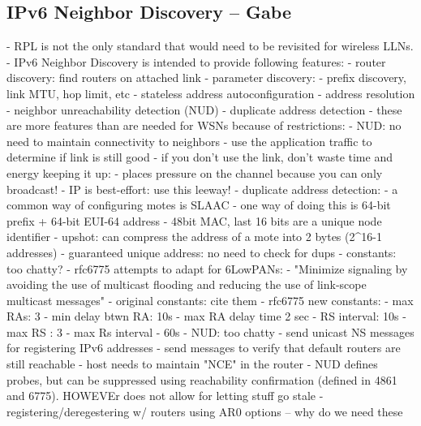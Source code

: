 \subsection{IPv6 Neighbor Discovery -- Gabe }
- RPL is not the only standard that would need to be revisited for wireless LLNs.
- IPv6 Neighbor Discovery is intended to provide following features:
    - router discovery: find routers on attached link
    - parameter discovery:
        - prefix discovery, link MTU, hop limit, etc
    - stateless address autoconfiguration
    - address resolution
    - neighbor unreachability detection (NUD)
    - duplicate address detection
- these are more features than are needed for WSNs because of restrictions:
    - NUD: no need to maintain connectivity to neighbors
        - use the application traffic to determine if link is still good
        - if you don't use the link, don't waste time and energy keeping it up:
            - places pressure on the channel because you can only broadcast!
        - IP is best-effort: use this leeway!
    - duplicate address detection:
        - a common way of configuring motes is SLAAC
        - one way of doing this is 64-bit prefix + 64-bit EUI-64 address
        - 48bit MAC, last 16 bits are a unique node identifier
        - upshot: can compress the address of a mote into 2 bytes (2^16-1 addresses)
        - guaranteed unique address: no need to check for dups
- constants: too chatty?
    - rfc6775 attempts to adapt for 6LowPANs:
    - "Minimize signaling by avoiding the use of multicast
      flooding and reducing the use of link-scope multicast messages"
    - original constants: cite them
    - rfc6775 new constants:
        - max RAs: 3
        - min delay btwn RA: 10s
        - max RA delay time 2 sec
        - RS interval: 10s
        - max RS : 3
        - max Rs interval - 60s
- NUD: too chatty
    - send unicast NS messages for registering IPv6 addresses
    - send messages to verify that default routers are still reachable
    - host needs to maintain "NCE" in the router
    - NUD defines probes, but can be suppressed using reachability confirmation
      (defined in 4861 and 6775). HOWEVEr does not allow for letting stuff go stale
    - registering/deregestering w/ routers using AR0 options -- why do we need these
\fi
